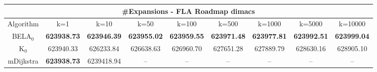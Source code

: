 \begin{tabular}{c|cccccccc}\toprule
\multicolumn{9}{c}{#Expansions - FLA Roadmap dimacs}\\ \midrule
Algorithm & k=1 & k=10 & k=50 & k=100 & k=500 & k=1000 & k=5000 & k=10000 \\ \midrule
BELA$_0$ & \textbf{623938.73} & \textbf{623946.39} & \textbf{623955.02} & \textbf{623959.55} & \textbf{623971.48} & \textbf{623977.81} & \textbf{623992.51} & \textbf{623999.04} \\
K$_0$ & 623940.33 & 626233.84 & 626638.63 & 626960.70 & 627651.28 & 627889.79 & 628630.16 & 628905.10 \\
mDijkstra & \textbf{623938.73} & 6239418.94 & -- & -- & -- & -- & -- & -- \\ \bottomrule 
\end{tabular}
